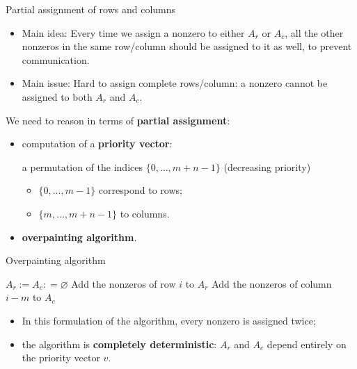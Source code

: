 \begin{frame}{Partial assignment of rows and columns}

\begin{itemize}
		\item	Main idea: Every time we assign a nonzero to either $A_r$ or $A_c$, all the other nonzeros in the same row/column should be assigned to it as well, to prevent communication.
		\item	Main issue: Hard to assign complete rows/column: a nonzero cannot be assigned to both $A_r$ and $A_c$.
\end{itemize}

We need to reason in terms of \textbf{partial assignment}:

	\begin{itemize}
		\item	computation of a \textbf{priority vector}:
			
			a permutation of the indices $\{0,\dots,m+n-1\}$ (decreasing priority) 
			\begin{itemize}
				\item  $\{0,\dots,m-1\}$ correspond to rows;
				\item  $\{m,\dots,m+n-1\}$ to columns.
			\end{itemize}
		\item \textbf{overpainting algorithm}.
	\end{itemize}
\end{frame}


\begin{frame}{Overpainting algorithm}
\begin{algorithm}[H]
	\begin{algorithmic}
		\State $A_r := A_c: = \varnothing$
	\State Add the nonzeros of row $i$ to $A_r$
	\Else
	\State Add the nonzeros of column $i-m$ to $A_c$
	\EndIf
	\EndFor
\end{algorithmic}
\end{algorithm}

\vspace{-0.4cm}

\begin{itemize}
	\item In this formulation of the algorithm, every nonzero is assigned twice;
	\item the algorithm is \textbf{completely deterministic}: $A_r$ and $A_c$ depend entirely on the priority vector $v$.
\end{itemize}

\end{frame}

